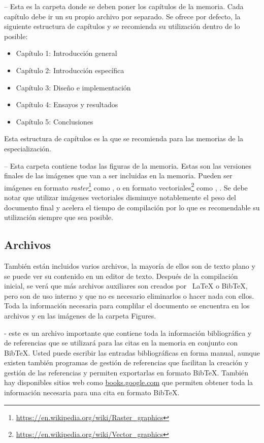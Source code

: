  -- Esta es la carpeta donde se deben poner los capítulos de la memoria. Cada capítulo debe ir un su propio archivo  por separado.  Se ofrece por defecto, la siguiente estructura de capítulos y se recomienda su utilización dentro de lo posible:

\begin{itemize}
\item Capítulo 1: Introducción general	
\item Capítulo 2: Introducción específica
\item Capítulo 3: Diseño e implementación
\item Capítulo 4: Ensayos y resultados
\item Capítulo 5: Conclusiones

\end{itemize}

Esta estructura de capítulos es la que se recomienda para las memorias de la especialización.

 -- Esta carpeta contiene todas las figuras de la memoria.  Estas son las versiones finales de las imágenes que van a ser incluidas en la memoria.  Pueden ser imágenes en formato \textit{raster}\footnote{\url{https://en.wikipedia.org/wiki/Raster_graphics}} como ,  o en formato vectoriales\footnote{\url{https://en.wikipedia.org/wiki/Vector_graphics}} como , .  Se debe notar que utilizar imágenes vectoriales disminuye notablemente el peso del documento final y acelera el tiempo de compilación por lo que es recomendable su utilización siempre que sea posible.

\subsection{Archivos}

También están incluidos varios archivos, la mayoría de ellos son de texto plano y se puede ver su contenido en un editor de texto. Después de la compilación inicial, se verá que más archivos auxiliares son creados por \ LaTeX{} o BibTeX, pero son de uso interno y que no es necesario eliminarlos o hacer nada con ellos.  Toda la información necesaria para complilar el documento se encuentra en los archivos  y en las imágenes de la carpeta Figures.

 - este es un archivo importante que contiene toda la información bibliográfica y de referencias que se utilizará para las citas en la memoria en conjunto con BibTeX. Usted puede escribir las entradas bibliográficas en forma manual, aunque existen también programas de gestión de referencias que facilitan la creación y gestión de las referencias y permiten exportarlas en formato BibTeX.  También hay disponibles sitios web como \url{books.google.com} que permiten obtener toda la información necesaria para una cita en formato BibTeX.

